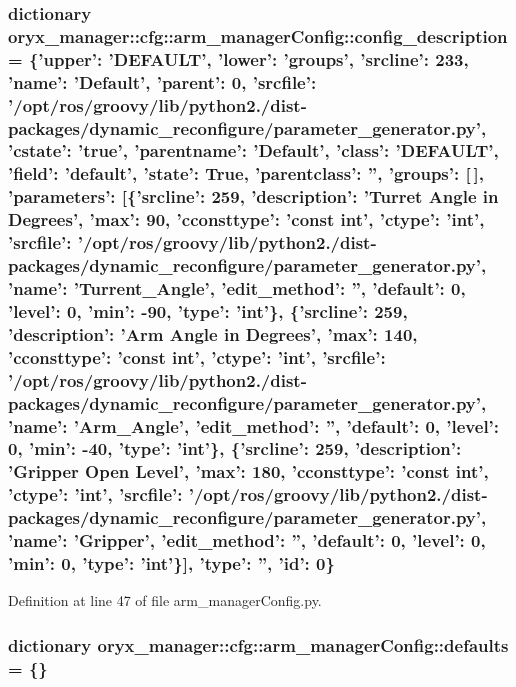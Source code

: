 \subsubsection[{config\-\_\-description}]{\setlength{\rightskip}{0pt plus 5cm}dictionary {\bf oryx\-\_\-manager\-::cfg\-::arm\-\_\-manager\-Config\-::config\-\_\-description} = \{'upper'\-: '\-D\-E\-F\-A\-U\-L\-T', 'lower'\-: 'groups', 'srcline'\-: 233, 'name'\-: '\-Default', 'parent'\-: 0, 'srcfile'\-: '/opt/ros/groovy/lib/python2./dist-\/packages/dynamic\-\_\-reconfigure/parameter\-\_\-generator.\-py', 'cstate'\-: 'true', 'parentname'\-: '\-Default', 'class'\-: '\-D\-E\-F\-A\-U\-L\-T', 'field'\-: '{\bf default}', 'state'\-: \-True, 'parentclass'\-: '', 'groups'\-: [$\,$], 'parameters'\-: [\{'srcline'\-: 259, 'description'\-: '\-Turret \-Angle in \-Degrees', '{\bf max}'\-: 90, 'cconsttype'\-: 'const int', 'ctype'\-: 'int', 'srcfile'\-: '/opt/ros/groovy/lib/python2./dist-\/packages/dynamic\-\_\-reconfigure/parameter\-\_\-generator.\-py', 'name'\-: '\-Turrent\-\_\-\-Angle', 'edit\-\_\-method'\-: '', '{\bf default}'\-: 0, '{\bf level}'\-: 0, '{\bf min}'\-: -\/90, '{\bf type}'\-: 'int'\}, \{'srcline'\-: 259, 'description'\-: '\-Arm \-Angle in \-Degrees', '{\bf max}'\-: 140, 'cconsttype'\-: 'const int', 'ctype'\-: 'int', 'srcfile'\-: '/opt/ros/groovy/lib/python2./dist-\/packages/dynamic\-\_\-reconfigure/parameter\-\_\-generator.\-py', 'name'\-: '\-Arm\-\_\-\-Angle', 'edit\-\_\-method'\-: '', '{\bf default}'\-: 0, '{\bf level}'\-: 0, '{\bf min}'\-: -\/40, '{\bf type}'\-: 'int'\}, \{'srcline'\-: 259, 'description'\-: '\-Gripper \-Open \-Level', '{\bf max}'\-: 180, 'cconsttype'\-: 'const int', 'ctype'\-: 'int', 'srcfile'\-: '/opt/ros/groovy/lib/python2./dist-\/packages/dynamic\-\_\-reconfigure/parameter\-\_\-generator.\-py', 'name'\-: '\-Gripper', 'edit\-\_\-method'\-: '', '{\bf default}'\-: 0, '{\bf level}'\-: 0, '{\bf min}'\-: 0, '{\bf type}'\-: 'int'\}], '{\bf type}'\-: '', 'id'\-: 0\}}\label{namespaceoryx__manager_1_1cfg_1_1arm__managerConfig_acda150fe74dc8f6017d646f41724b18a}


\-Definition at line 47 of file arm\-\_\-manager\-Config.\-py.

\subsubsection[{defaults}]{\setlength{\rightskip}{0pt plus 5cm}dictionary {\bf oryx\-\_\-manager\-::cfg\-::arm\-\_\-manager\-Config\-::defaults} = \{\}}\label{namespaceoryx__manager_1_1cfg_1_1arm__managerConfig_a606accedcea4521e39878029ec415a6f}


